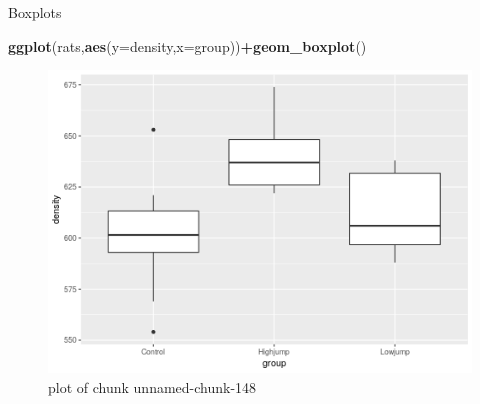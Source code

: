 \documentclass[ignorenonframetext,]{beamer}
\newenvironment{Shaded}{\begin{snugshade}}{\end{snugshade}}
\newcommand{\DataTypeTok}[1]{\textcolor[rgb]{0.13,0.29,0.53}{#1}}
\newcommand{\KeywordTok}[1]{\textcolor[rgb]{0.13,0.29,0.53}{\textbf{#1}}}
\newcommand{\NormalTok}[1]{#1}
\newcommand{\OperatorTok}[1]{\textcolor[rgb]{0.81,0.36,0.00}{\textbf{#1}}}
\begin{document}
\begin{frame}[fragile]{Boxplots}
\protect\hypertarget{boxplots-1}{}

\begin{Shaded}
\begin{Highlighting}[]
\KeywordTok{ggplot}\NormalTok{(rats,}\KeywordTok{aes}\NormalTok{(}\DataTypeTok{y=}\NormalTok{density,}\DataTypeTok{x=}\NormalTok{group))}\OperatorTok{+}\KeywordTok{geom_boxplot}\NormalTok{()}
\end{Highlighting}
\end{Shaded}

\begin{figure}
\centering
\includegraphics{figure/unnamed-chunk-148-1.png}
\caption{plot of chunk unnamed-chunk-148}
\end{figure}

\end{frame}
\end{document}
